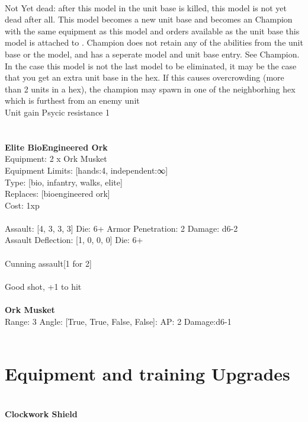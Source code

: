 \ \\
Not Yet dead: after this model in the unit base is killed, this model is not yet dead after all. This model becomes a new unit base and becomes an Champion with the same equipment as this model and orders available as the unit base this model is attached to . Champion does not retain any of the abilities from the unit base or the model, and has a seperate model and unit base entry. See Champion. In the case this model is not the last model to be eliminated, it may be the case that you get an extra unit base in the hex. If this causes overcrowding (more than 2 units in a hex), the champion may spawn in one of the neighborhing hex which is furthest from an enemy unit\\ 
Unit gain Psycic resistance 1\\ 

\ \\
 
\ \\

{\bf Elite BioEngineered Ork } \\
Equipment: 2 x Ork Musket \\
Equipment Limits: [hands:4, independent:∞] \\
Type: [bio, infantry, walks, elite] \\
Replaces: [bioengineered ork] \\
Cost: 1xp\\
\ \\
Assault: [4, 3, 3, 3] Die: 6+ Armor Penetration: 2 Damage: d6-2 \\
Assault Deflection: [1, 0, 0, 0] Die: 6+\\
\\ 
Cunning assault[1 for 2]\\ 
 
\ \\
Good shot, +1 to hit\\ 

\ \\
{\bf Ork Musket } \\



Range: 3  Angle: [True, True, False, False]: AP: 2 Damage:d6-1 \\




 
\ \\

\section{Equipment and training Upgrades}\ \\
{\bf Clockwork Shield } \\

